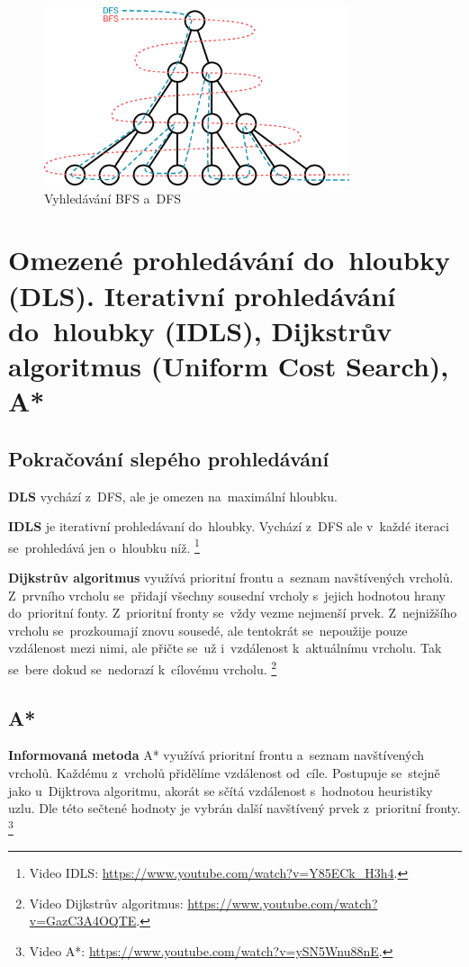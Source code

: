\begin{figure}[ht]
	\centering
	\includegraphics[width=0.8\textwidth]{images/bfs-dfs.png}
	\caption{Vyhledávání BFS a~DFS}
\end{figure}

\clearpage
\section{Omezené prohledávání do~hloubky (DLS). Iterativní prohledávání do~hloubky (IDLS), Dijkstrův algoritmus (Uniform Cost Search), A*}

\subsection{Pokračování slepého prohledávání}

\textbf{DLS} vychází z~DFS, ale je omezen na~maximální hloubku.

\textbf{IDLS} je iterativní prohledávaní do~hloubky. Vychází z~DFS ale v~každé iteraci se~prohledává jen o~hloubku níž.%
\footnote{Video IDLS: \url{https://www.youtube.com/watch?v=Y85ECk_H3h4}.}

\textbf{Dijkstrův algoritmus} využívá prioritní frontu a~seznam navštívených vrcholů. Z~prvního vrcholu se~přidají všechny sousední vrcholy s~jejich hodnotou hrany do~prioritní fonty. Z~prioritní fronty se~vždy vezme nejmenší prvek. Z~nejnižšího vrcholu se~prozkoumají znovu sousedé, ale tentokrát se~nepoužije pouze vzdálenost mezi nimi, ale přičte se~už i~vzdálenost k~aktuálnímu vrcholu. Tak se~bere dokud se~nedorazí k~cílovému vrcholu.%
\footnote{Video Dijkstrův algoritmus: \url{https://www.youtube.com/watch?v=GazC3A4OQTE}.}

\subsection{A*}

\textbf{Informovaná metoda} A* využívá prioritní frontu a~seznam navštívených vrcholů. Každému z~vrcholů přidělíme vzdálenost od~cíle. Postupuje se~stejně jako u~Dijktrova algoritmu, akorát se sčítá vzdálenost s~hodnotou heuristiky uzlu. Dle této sečtené hodnoty je vybrán další navštívený prvek z~prioritní fronty.%
\footnote{Video A*: \url{https://www.youtube.com/watch?v=ySN5Wnu88nE}.}


